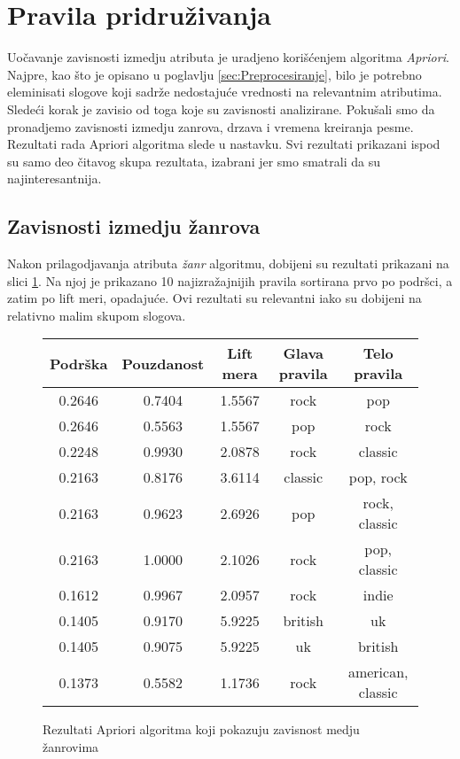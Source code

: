 \section{Pravila pridru\v{z}ivanja}
\label{sec:PravilaPridruzivanja}

Uo\v{c}avanje zavisnosti izmedju atributa je uradjeno kori\v{s}\'c{}enjem algoritma \emph{Apriori}. Najpre, kao \v{s}to je opisano u poglavlju \ref{sec:Preprocesiranje}, bilo je potrebno eleminisati slogove koji sadr\v{z}e nedostaju\'c{}e vrednosti na relevantnim atributima. Slede\'c{}i korak je zavisio od toga koje su zavisnosti analizirane. Poku\v{s}ali smo da pronadjemo zavisnosti izmedju zanrova, drzava i vremena kreiranja pesme. Rezultati rada Apriori algoritma slede u nastavku. Svi rezultati prikazani ispod su samo deo \v{c}itavog skupa rezultata, izabrani jer smo smatrali da su najinteresantnija.


\subsection{Zavisnosti izmedju \v{z}anrova}
\label{subsec:AprioriZavisnostZanrova}

Nakon prilagodjavanja atributa \emph{\v{z}anr} algoritmu, dobijeni su rezultati prikazani na slici \ref{fig:aprioriZanrovi}. Na njoj je prikazano 10 najizra\v{z}ajnijih pravila sortirana prvo po podr\v{s}ci, a zatim po lift meri, opadaju\'c{}e.
Ovi rezultati su relevantni iako su dobijeni na relativno malim skupom slogova.

\begin{figure}[H]
    \footnotesize
    \centering
    \begin{tabular}{|c|c|c|c|c|}
        \hline
        Podr\v{s}ka & Pouzdanost & Lift mera & Glava pravila & Telo pravila \\
        \hline
        0.2646 & 0.7404 & 1.5567 & rock & pop \\
        0.2646 & 0.5563 & 1.5567 & pop & rock \\
        0.2248 & 0.9930 & 2.0878 & rock & classic \\
        0.2163 & 0.8176 & 3.6114 & classic & pop, rock \\
        0.2163 & 0.9623 & 2.6926 & pop & rock, classic \\
        0.2163 & 1.0000 & 2.1026 & rock & pop, classic \\
        0.1612 & 0.9967 & 2.0957 & rock & indie \\
        0.1405 & 0.9170 & 5.9225 & british & uk \\
        0.1405 & 0.9075 & 5.9225 & uk & british \\
        0.1373 & 0.5582 & 1.1736 & rock & american, classic \\
        \hline
    \end{tabular}
    \caption{Rezultati Apriori algoritma koji pokazuju zavisnost medju \v{z}anrovima}
    \label{fig:aprioriZanrovi}
\end{figure}


